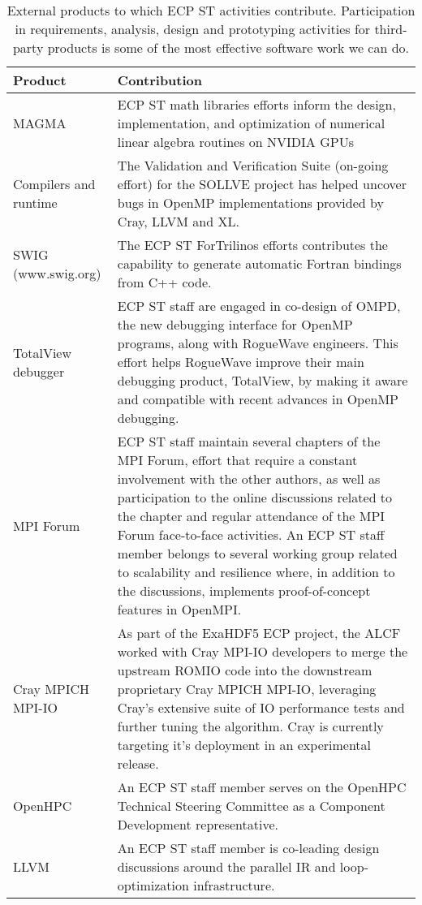 \begin{table}
	\begin{tabular}{|L{1.5in}|L{4in}|}\hline
			Product & Contribution\\\hline
			MAGMA & ECP ST math libraries efforts inform the design, implementation, and optimization of numerical linear algebra routines on NVIDIA GPUs\\\hline
			Compilers and runtime & The Validation and Verification Suite (on-going effort) for the SOLLVE project has helped uncover bugs in OpenMP implementations provided by Cray, LLVM and XL.\\\hline
			SWIG (www.swig.org) & The ECP ST ForTrilinos efforts contributes the capability to generate automatic Fortran bindings from C++ code.\\\hline
			TotalView debugger & ECP ST staff are engaged in co-design of OMPD, the new debugging interface for OpenMP programs, along with RogueWave engineers. This effort helps RogueWave improve their main debugging product, TotalView, by making it aware and compatible with recent advances in OpenMP debugging.\\\hline
			MPI Forum & ECP ST staff maintain several chapters of the MPI Forum, effort that require a constant involvement with the other authors, as well as participation to the online discussions related to the chapter and regular attendance of the MPI Forum face-to-face activities. An ECP ST staff member belongs to several working group related to scalability and resilience where, in addition to the discussions, implements proof-of-concept features in OpenMPI.\\\hline
			Cray MPICH MPI-IO & As part of the ExaHDF5 ECP project, the ALCF worked with Cray MPI-IO developers to merge the upstream ROMIO code into the downstream proprietary Cray MPICH MPI-IO, leveraging Cray’s extensive suite of IO performance tests and further tuning the algorithm.  Cray is currently targeting it’s deployment in an experimental release.\\\hline
			OpenHPC & An ECP ST staff member serves on the OpenHPC Technical Steering Committee as a Component Development representative.\\\hline
			LLVM &  An ECP ST staff member is co-leading design discussions around the parallel IR and loop-optimization infrastructure.\\\hline
		\end{tabular}
		\caption{\label{table:externalproducts} External products to which ECP ST activities contribute.  Participation in requirements, analysis, design and prototyping activities for third-party products is some of the most effective software work we can do.}
	\end{table}
